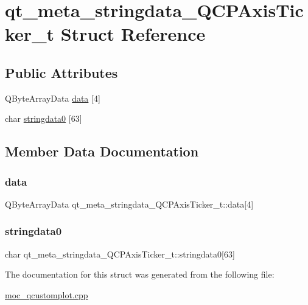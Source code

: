 \hypertarget{structqt__meta__stringdata__QCPAxisTicker__t}{}\section{qt\+\_\+meta\+\_\+stringdata\+\_\+\+Q\+C\+P\+Axis\+Ticker\+\_\+t Struct Reference}
\label{structqt__meta__stringdata__QCPAxisTicker__t}
\subsection*{Public Attributes}
\begin{DoxyCompactItemize}
\item 
Q\+Byte\+Array\+Data \mbox{\hyperlink{structqt__meta__stringdata__QCPAxisTicker__t_a0e5e6cc358157945592776d87e7d14b4}{data}} \mbox{[}4\mbox{]}
\item 
char \mbox{\hyperlink{structqt__meta__stringdata__QCPAxisTicker__t_a8600a85cebf0ead1c96536e854070e8b}{stringdata0}} \mbox{[}63\mbox{]}
\end{DoxyCompactItemize}


\subsection{Member Data Documentation}
\mbox{\label{structqt__meta__stringdata__QCPAxisTicker__t_a0e5e6cc358157945592776d87e7d14b4}} 
\subsubsection{\texorpdfstring{data}{data}}
{\footnotesize\ttfamily Q\+Byte\+Array\+Data qt\+\_\+meta\+\_\+stringdata\+\_\+\+Q\+C\+P\+Axis\+Ticker\+\_\+t\+::data\mbox{[}4\mbox{]}}

\mbox{\label{structqt__meta__stringdata__QCPAxisTicker__t_a8600a85cebf0ead1c96536e854070e8b}} 
\subsubsection{\texorpdfstring{stringdata0}{stringdata0}}
{\footnotesize\ttfamily char qt\+\_\+meta\+\_\+stringdata\+\_\+\+Q\+C\+P\+Axis\+Ticker\+\_\+t\+::stringdata0\mbox{[}63\mbox{]}}



The documentation for this struct was generated from the following file\+:\begin{DoxyCompactItemize}
\item 
\mbox{\hyperlink{moc__qcustomplot_8cpp}{moc\+\_\+qcustomplot.\+cpp}}\end{DoxyCompactItemize}

